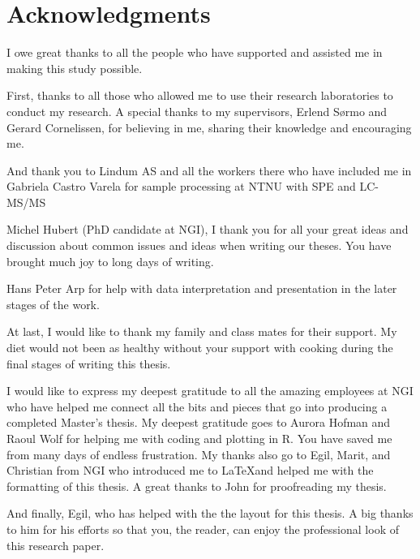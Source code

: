 \newpage
{}
\section*{Acknowledgments}
I owe great thanks to all the people who have supported and assisted me in making this study possible. 

First, thanks to all those who allowed me to use their research laboratories to conduct my research. A special thanks to my supervisors, Erlend Sørmo and Gerard Cornelissen, for believing in me, sharing their knowledge and encouraging me.

And thank you to Lindum AS and all the workers there  who have included me in 
Gabriela Castro Varela for sample processing at NTNU with SPE and LC-MS/MS

Michel Hubert (PhD candidate at NGI), I thank you for all your great ideas and discussion about common issues and ideas when writing our theses. You have brought much joy to long days of writing. 

Hans Peter Arp for help with data interpretation and presentation in the later stages of the work. 

At last, I would like to thank my family and class mates for their support. My diet would not been as healthy without your support with cooking during the final stages of writing this thesis. 

I would like to express my deepest gratitude to all the amazing employees at NGI who have helped me connect all the bits and pieces that go into producing a completed Master's thesis. 
My deepest gratitude goes to Aurora Hofman and Raoul Wolf for helping me with coding and plotting in R. You have saved me from many days of endless frustration. My thanks also go to Egil, Marit, and Christian from NGI who introduced me to \LaTeX and helped me with the formatting of this thesis. A great thanks to John for proofreading my thesis. 

And finally, Egil, who has helped with the the layout for this thesis. A big thanks to him for his efforts so that you, the reader, can enjoy the professional look of this research paper. 